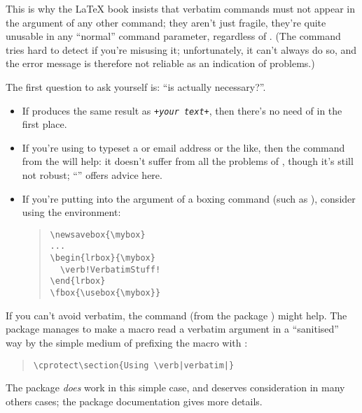 This is why the \LaTeX{} book insists that verbatim
commands must not appear in the argument of any other command; they
aren't just fragile, they're quite unusable in any ``normal'' command
parameter, 
regardless of .  (The 
command tries hard to detect if you're misusing it; unfortunately, it
can't always do so, and the error message is therefore not reliable as an
indication of problems.)

The first question to ask yourself is: ``is  actually
necessary?''.
\begin{itemize}
\item If  produces the same result
  as \texttt{+\emph{your text}+}, then there's no need of
   in the first place.
\item If you're using  to typeset a  or email
  address or the like, then the  command from the
   will help: it doesn't suffer from all the problems of
  , though it's still not robust; %
  ``'' offers advice here.
\item If you're putting  into the argument of a boxing
  command (such as ), consider using the 
  environment:
\begin{quote}
\begin{verbatim}
\newsavebox{\mybox}
...
\begin{lrbox}{\mybox}
  \verb!VerbatimStuff!
\end{lrbox}
\fbox{\usebox{\mybox}}
\end{verbatim}
\end{quote}
\end{itemize}

If you can't avoid verbatim, the  command (from the
package ) might help.  The package manages to make a
macro read a verbatim argument in a ``sanitised'' way by the simple
medium of prefixing the macro with :
\begin{quote}
\begin{verbatim}
\cprotect\section{Using \verb|verbatim|}
\end{verbatim}
\end{quote}
The package \emph{does} work in this simple case, and deserves
consideration in many others cases; the package documentation gives
more details.

